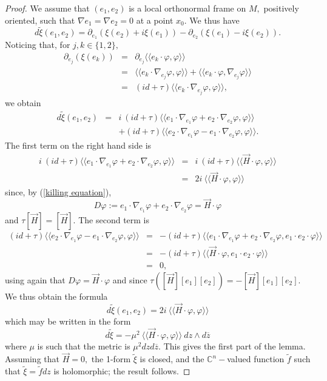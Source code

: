 \documentclass{amsart}
\begin{document}
\begin{proof}
We assume that $(e_1,e_2)$ is a local orthonormal frame on $M,$ positively oriented, such that $\nabla e_1=\nabla e_2=0$ at a point $x_0.$ We thus have
$$d\tilde\xi(e_1,e_2)=\partial_{e_1}\left(\xi(e_2)+i\xi(e_1)\right)-\partial_{e_2}\left(\xi(e_1)-i\xi(e_2)\right).$$
Noticing that, for $j,k\in\{1,2\},$ 
\begin{eqnarray*}
\partial_{e_j}\left(\xi(e_k)\right)&=&\partial_{e_j}\langle\langle e_k\cdot\varphi,\varphi\rangle\rangle\\
&=&\langle\langle e_k\cdot\nabla_{e_j}\varphi,\varphi\rangle\rangle+\langle\langle e_k\cdot\varphi,\nabla_{e_j}\varphi\rangle\rangle\\
&=&(id+\tau)\langle\langle e_k\cdot\nabla_{e_j}\varphi,\varphi\rangle\rangle,
\end{eqnarray*}
we obtain
\begin{eqnarray*}
d\tilde\xi(e_1,e_2)&=&i\ (id+\tau)\langle\langle e_1\cdot\nabla_{e_1}\varphi+e_2\cdot\nabla_{e_2}\varphi,\varphi\rangle\rangle\\&&+(id+\tau)\langle\langle e_2\cdot\nabla_{e_1}\varphi-e_1\cdot\nabla_{e_2}\varphi,\varphi\rangle\rangle.
\end{eqnarray*}
The first term on the right hand side is
\begin{eqnarray*}
i\ (id+\tau)\langle\langle e_1\cdot\nabla_{e_1}\varphi+e_2\cdot\nabla_{e_2}\varphi,\varphi\rangle\rangle&=&i\ (id+\tau)\langle\langle \vec H\cdot\varphi,\varphi\rangle\rangle\\
&=&2i\ \langle\langle \vec H\cdot\varphi,\varphi\rangle\rangle
\end{eqnarray*}
since, by (\ref{killing equation}), 
$$D\varphi:=e_1\cdot\nabla_{e_1}\varphi+e_2\cdot\nabla_{e_2}\varphi=\vec H\cdot\varphi$$
and $\tau[\vec H]=[\vec H].$ The second term is
\begin{eqnarray*}
(id+\tau)\langle\langle e_2\cdot\nabla_{e_1}\varphi-e_1\cdot\nabla_{e_2}\varphi,\varphi\rangle\rangle&=&-(id+\tau)\langle\langle e_1\cdot\nabla_{e_1}\varphi+e_2\cdot\nabla_{e_2}\varphi,e_1\cdot e_2\cdot\varphi\rangle\rangle\\
&=&-(id+\tau)\langle\langle \vec H\cdot \varphi,e_1\cdot e_2\cdot\varphi\rangle\rangle\\
&=&0,
\end{eqnarray*}
using again that $D\varphi=\vec H\cdot\varphi$ and since $\tau\left([\vec H][e_1][e_2]\right)=-[\vec H][e_1][e_2].$ We thus obtain the formula
$$d\tilde\xi(e_1,e_2)=2i\ \langle\langle \vec H\cdot\varphi,\varphi\rangle\rangle$$
which may be written in the form
\begin{equation}\label{dxi tilde}
d\tilde\xi=-\mu^2\ \langle\langle\vec H\cdot\varphi,\varphi\rangle\rangle\ dz\wedge d\overline{z}
\end{equation}
where $\mu$ is such that the metric is $\mu^2 dzd\overline{z}.$ This gives the first part of the lemma. Assuming that $\vec H=0,$ the 1-form $\tilde \xi$ is closed, and the ${\mathbb{C}}^n-$valued function $\tilde f$ such that $\tilde\xi=\tilde f dz$ is holomorphic; the result follows.
\end{proof}
\end{document}
